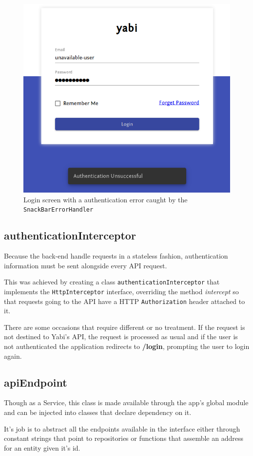 \begin{figure}
  \centering
  \includegraphics[width=.7\textwidth]{images/screenshots/login-error}
  \caption{Login screen with a authentication error caught by the \texttt{SnackBarErrorHandler}}\label{fig:loginerror}
\end{figure}

\subsection{authenticationInterceptor}
Because the back-end handle requests in a stateless fashion, authentication information must be sent alongside every \gls{API} request.

This was achieved by creating a class \texttt{authenticationInterceptor} that implements the \texttt{HttpInterceptor} interface, overriding the method \textit{intercept} so that requests going to the \gls{API} have a \gls{HTTP} \texttt{Authorization} header attached to it.

There are some occasions that require different or no treatment. If the request is not destined to \gls{Yabi}'s \gls{API}, the request is processed as usual and if the user is not authenticated the application redirects to \textbf{/login}, prompting the user to login again.

\subsection{apiEndpoint}
Though as a Service, this class is made available through the app's global module and can be injected into classes that declare dependency on it.

It's job is to abstract all the endpoints available in the interface either through constant strings that point to repositories or functions that assemble an address for an entity given it's id.

